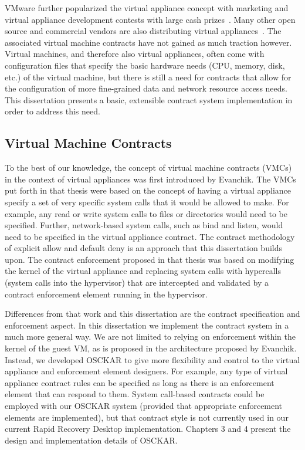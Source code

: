 VMware further popularized the virtual appliance concept with marketing and virtual appliance development contests with large cash prizes~\cite{herrod_keynote_2006,vmware_appliances_website}. Many other open source and commercial vendors are also distributing virtual appliances~\cite{rPath_website, stacklet_website, virtual_appliances_website, jumpbox_website}. The associated virtual machine contracts have not gained as much traction however. Virtual machines, and therefore also virtual appliances, often come with configuration files that specify the basic hardware needs (CPU, memory, disk, etc.) of the virtual machine, but there is still a need for contracts that allow for the configuration of more fine-grained data and network resource access needs. This dissertation presents a basic, extensible contract system implementation in order to address this need.

\subsection{Virtual Machine Contracts}
\label{VirtualMachineContracts}
To the best of our knowledge, the concept of virtual machine contracts (VMCs) in the context of virtual appliances was first introduced by Evanchik\cite{evanchik_thesis_2004}. The VMCs put forth in that thesis were based on the concept of having a virtual appliance specify a set of very specific system calls that it would be allowed to make. For example, any read or write system calls to files or directories would need to be specified. Further, network-based system calls, such as bind and listen, would need to be specified in the virtual appliance contract. The contract methodology of explicit allow and default deny is an approach that this dissertation builds upon. The contract enforcement proposed in that thesis was based on modifying the kernel of the virtual appliance and replacing system calls with hypercalls (system calls into the hypervisor) that are intercepted and validated by a contract enforcement element running in the hypervisor. 

Differences from that work and this dissertation are the contract specification and enforcement aspect. In this dissertation we implement the contract system in a much more general way. We are not limited to relying on enforcement within the kernel of the guest VM, as is proposed in the architecture proposed by Evanchik\cite{evanchik_thesis_2004}. Instead, we developed OSCKAR to give more flexibility and control to the virtual appliance and enforcement element designers. For example, any type of virtual appliance contract rules can be specified as long as there is an enforcement element that can respond to them. System call-based contracts could be employed with our OSCKAR system (provided that appropriate enforcement elements are implemented), but that contract style is not currently used in our current Rapid Recovery Desktop implementation. Chapters 3 and 4 present the design and implementation details of OSCKAR.

